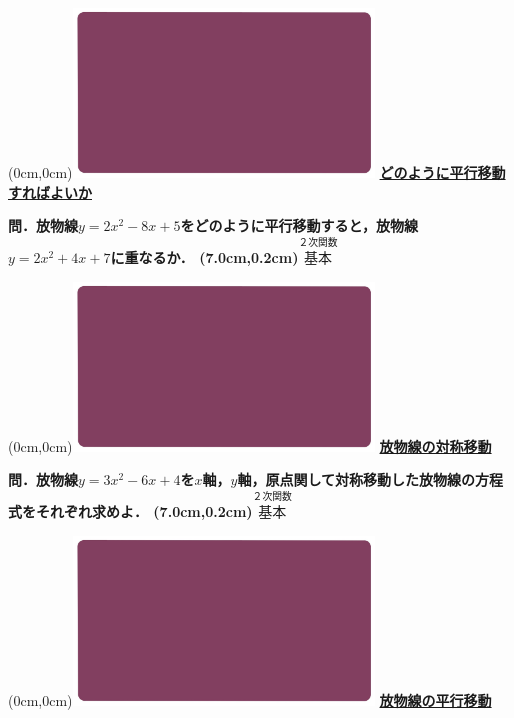 \documentclass[10pt,
fleqn,
dvipdfmx,
uplatex
]{jsarticle}
\begin{document}
\at(0cm,0cm){\includegraphics[width=8cm,bb=0 0 1920 1080]{./youtube/thumbnails/templates/smart_background/２次関数.jpeg}}
{\color{orange}\bf\boldmath\large\underline{どのように平行移動すればよいか}}\vspace{0.3zw}

\LARGE 
\bf\boldmath 問．放物線$y=2x^2-8x+5$をどのように平行移動すると，放物線$y=2x^2+4x+7$に重なるか．
\at(7.0cm,0.2cm){\small\color{bradorange}$\overset{\text{２次関数}}{\text{基本}}$}


\newpage



\at(0cm,0cm){\includegraphics[width=8cm,bb=0 0 1920 1080]{./youtube/thumbnails/templates/smart_background/２次関数.jpeg}}
{\color{orange}\bf\boldmath\huge\underline{放物線の対称移動}}\vspace{0.3zw}

\Large 
\bf\boldmath 問．放物線$y=3x^2-6x+4$を$x$軸，$y$軸，原点関して対称移動した放物線の方程式をそれぞれ求めよ．
\at(7.0cm,0.2cm){\small\color{bradorange}$\overset{\text{２次関数}}{\text{基本}}$}


\newpage



\at(0cm,0cm){\includegraphics[width=8cm,bb=0 0 1920 1080]{./youtube/thumbnails/templates/smart_background/２次関数.jpeg}}
{\color{orange}\bf\boldmath\huge\underline{放物線の平行移動}}\vspace{0.3zw}
\end{document}
